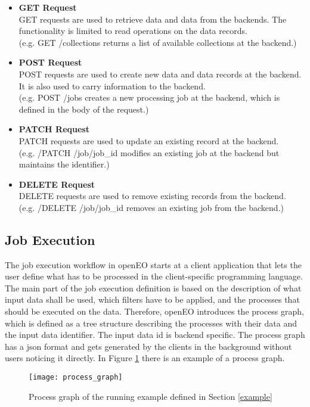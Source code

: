 \documentclass[draft,final]{vutinfth} %
\begin{document}
\begin{itemize}
	\item \textbf{GET Request} \\
	GET requests are used to retrieve data and data from the backends. The functionality is limited to read operations on the data records. \\(e.g. GET /collections returns a list of available collections at the backend.)
	\item \textbf{POST Request} \\ 
	POST requests are used to create new data and data records at the backend. It is also used to carry information to the backend.  \\(e.g. POST /jobs creates a new processing job at the backend, which is defined in the body of the request.)  
	\item \textbf{PATCH Request} \\
	PATCH requests are used to update an existing record at the backend. \\(e.g. /PATCH /job/{job\_id} modifies an existing job at the backend but maintains the identifier.)
	\item \textbf{DELETE Request} \\ 
	DELETE requests are used to remove existing records from the backend. \\(e.g. /DELETE /job/{job\_id} removes an existing job from the backend.)
\end{itemize}

\subsection{Job Execution}\label{Job Execution}
The job execution workflow in openEO starts at a client application that lets the user define what has to be processed in the client-specific programming language.
The main part of the job execution definition is based on the description of what input data shall be used, which filters have to be applied, and the processes that should be executed on the data. Therefore, openEO introduces the process graph, which is defined as a tree structure describing the processes with their data and the input data identifier. The input data id is backend specific. The process graph has a \gls{json} format and gets generated by the clients in the background without users noticing it directly. In Figure \ref{fig:process_graph} there is an example of a process graph.  

\begin{figure}[h]
	\centering
	\texttt{[image: process\_graph]}
	\caption{Process graph of the running example defined in Section \ref{example}}
	\label{fig:process_graph} %
\end{figure}
\end{document}
